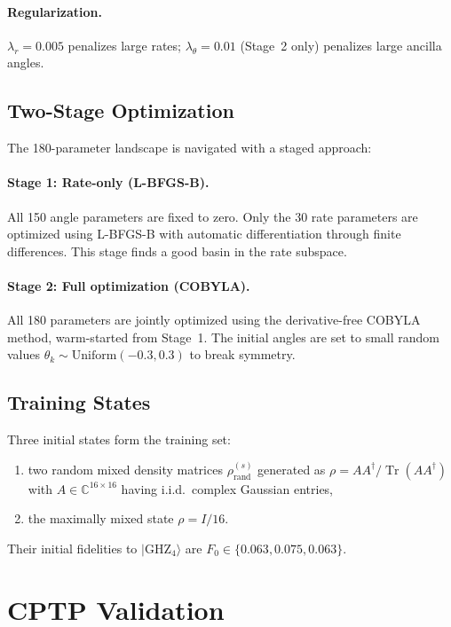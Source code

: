 \documentclass[11pt,a4paper]{article}
\newcommand{\ket}[1]{\lvert #1 \rangle}
\newcommand{\tr}{\operatorname{Tr}}
\newcommand{\C}{\mathbb{C}}
\begin{document}
\paragraph{Regularization.}
$\lambda_r = 0.005$ penalizes large rates;
$\lambda_\theta = 0.01$ (Stage~2 only) penalizes large ancilla angles.

\subsection{Two-Stage Optimization}

The 180-parameter landscape is navigated with a staged approach:

\paragraph{Stage 1: Rate-only (L-BFGS-B).}
All 150 angle parameters are fixed to zero.  Only the 30 rate
parameters are optimized using L-BFGS-B with automatic differentiation
through finite differences.  This stage finds a good basin in the
rate subspace.

\paragraph{Stage 2: Full optimization (COBYLA).}
All 180 parameters are jointly optimized using the derivative-free
COBYLA method, warm-started from Stage~1.  The initial angles are
set to small random values $\theta_k\sim\mathrm{Uniform}(-0.3,0.3)$
to break symmetry.

\subsection{Training States}

Three initial states form the training set:
\begin{enumerate}[label=(\roman*)]
  \item two random mixed density matrices $\rho_{\mathrm{rand}}^{(s)}$
    generated as $\rho = AA^\dagger / \tr(AA^\dagger)$
    with $A\in\C^{16\times16}$ having i.i.d.\ complex Gaussian entries,
  \item the maximally mixed state $\rho = I/16$.
\end{enumerate}

Their initial fidelities to $\ket{\mathrm{GHZ}_4}$ are
$F_0 \in \{0.063, 0.075, 0.063\}$.

\section{CPTP Validation}
\end{document}

